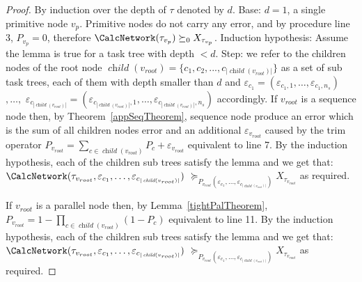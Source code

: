 \documentclass{article}
\DeclareMathOperator{\ch}{\textit{child}}
\begin{document}
\begin{proof}
By induction over the depth of $\tau$ denoted by $d$. Base: $ d=1$, a single primitive node $ v_p 
$. Primitive nodes do not carry any error, and by procedure \BuildPolynomial line 3, $P_{v_p}=0$, 
therefore  $\CalcNetwork(\tau_{v_p}) \succeq_0 X_{\tau_{v_p}}$. 
Induction hypothesis: Assume the lemma is true for a task tree with depth $ <d $. Step: we refer to the children nodes of the root node $\ch(v_{root})= \lbrace c_1, c_2,...,c_{|\ch(v_{root})|}\rbrace$ as a set of sub task trees, each of them with depth smaller than $ d $ and $\varepsilon_{c_1}=(\varepsilon_{c_1,1}, \dots,\varepsilon_{c_1,n_s})$ $, \dots, $  $\varepsilon_{c_{|\ch(v_{root})|}} = (\varepsilon_{c_{|\ch(v_{root})|},1}, \dots, \varepsilon_{c_{|\ch(v_{root})|},n_s})$ accordingly. 
If $v_{root}$ is a sequence node then,
by Theorem~\ref{appSeqTheorem}, sequence node produce an error which is the sum of all children nodes error and an additional $\varepsilon_{v_{root}}$ caused by the trim operator $P_{v_{root}}={\sum_{c \in \ch(v_{root})}{P_{c}}+ \varepsilon_{v_{root}}}$ equivalent to \BuildPolynomial line 7. By the induction hypothesis, each of the children sub trees satisfy the lemma and we get that:$ \CalcNetwork(\tau_{v_{root}}, \varepsilon_{c_1}, \dots, \varepsilon_{c_{|\ch(v_{root})|}})$ $\succeq_{P_{v_{root}}(\varepsilon_{c_1}, \dots, \varepsilon_{c_{|\ch(v_{root})|}})} X_{\tau_{v_{root}}} $ as required.

If $v_{root}$ is a parallel node then,
by Lemma~\ref{tightPalTheorem}, $P_{v_{root}}=1-\prod_{c \in \ch(v_{root})}{(1-P_{c})}$ equivalent to \BuildPolynomial line 11. By the induction hypothesis, each of the children sub trees satisfy the lemma and we get that:$ \CalcNetwork(\tau_{v_{root}}, \varepsilon_{c_1}, \dots, \varepsilon_{c_{|\ch(v_{root})|}})$ $\succeq_{P_{v_{root}}(\varepsilon_{c_1}, \dots, \varepsilon_{c_{|\ch(v_{root})|}})} X_{\tau_{v_{root}}} $ as required.
\end{proof}

\end{document}

